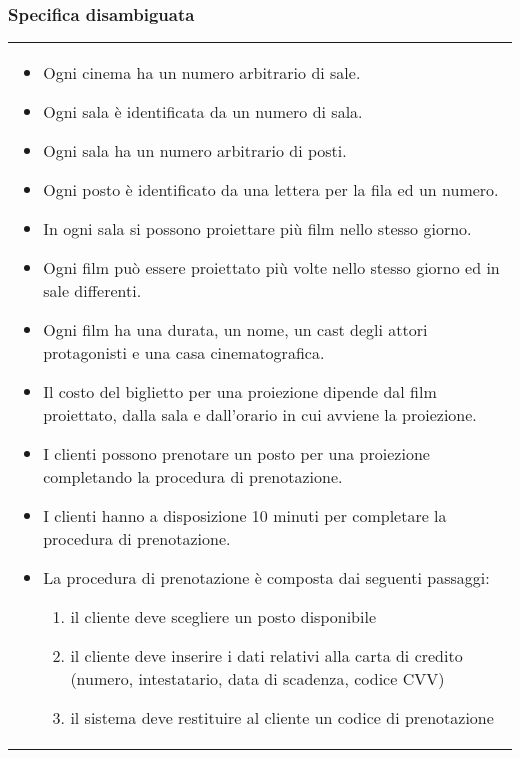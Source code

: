 \subsubsection*{Specifica disambiguata}

\begin{tabularx}{\linewidth}{|X|}
    \hline
    \begin{itemize}
        \item Ogni cinema ha un numero arbitrario di sale.
        \item Ogni sala è identificata da un numero di sala.
        \item Ogni sala ha un numero arbitrario di posti.
        \item Ogni posto è identificato da una lettera per la fila ed un numero.
        \item In ogni sala si possono proiettare più film nello stesso giorno.
        \item Ogni film può essere proiettato più volte nello stesso giorno ed
              in sale differenti.
        \item Ogni film ha una durata, un nome, un cast degli attori
              protagonisti e una casa cinematografica.
        \item Il costo del biglietto per una proiezione dipende dal film
              proiettato, dalla sala e dall'orario in cui avviene la proiezione.
        \item I clienti possono prenotare un posto per una proiezione
              completando la procedura di prenotazione.
        \item I clienti hanno a disposizione 10 minuti per completare la
              procedura di prenotazione.
        \item La procedura di prenotazione è composta dai seguenti passaggi:
              \begin{enumerate}
                  \item il cliente deve scegliere un posto disponibile
                  \item il cliente deve inserire i dati relativi alla carta
                        di credito (numero, intestatario, data di scadenza,
                        codice CVV)
                  \item il sistema deve restituire al cliente un codice di
                        prenotazione
              \end{enumerate}

\end{itemize}
\end{tabularx}
